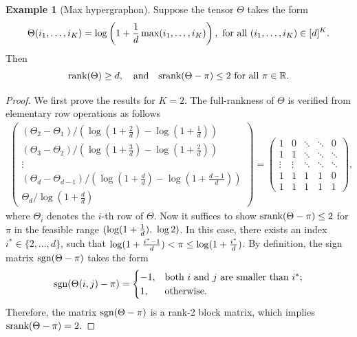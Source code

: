 \documentclass[11pt]{article}
\theoremstyle{plain}
\theoremstyle{definition}
\newtheorem{example}{Example}
\def\sign{\textup{sgn}}
\def\srank{\textup{srank}}
\def\rank{\textup{rank}}
\begin{document}
\begin{example}[Max hypergraphon]\label{example:max} Suppose the tensor $\Theta$ takes the form 
\[
\Theta(i_1,\ldots,i_K)=\log\left(1+{1\over d}\max(i_1,\ldots,i_K)\right), \ \text{for all }(i_1,\ldots,i_K)\in[d]^K.
\]
 Then 
 \[
 \rank(\Theta)\geq d, \quad \text{and}\quad \srank(\Theta-\pi)\leq 2\ \text{for all }\pi\in\mathbb{R}. 
 \]
\end{example}
\begin{proof}
We first prove the results for $K=2$. The full-rankness of $\Theta$ is verified from elementary row operations as follows
\begin{align}
\begin{pmatrix}
(\Theta_2-\Theta_1)/(\log(1+\frac{2}{d})-\log(1+\frac{1}{d}))\\(\Theta_3-\Theta_2)/(\log(1+\frac{3}{d})-\log(1+\frac{2}{d}))\\\vdots\\ (\Theta_d-\Theta_{d-1})/(\log(1+\frac{d}{d})-\log(1+\frac{d-1}{d}))\\\Theta_d/\log(1+\frac{d}{d})
\end{pmatrix} = \begin{pmatrix}
 1&          0  &      \ddots  &          \ddots  &          0 \\
1& 1 & \ddots &          \ddots    &         \ddots    \\
      \vdots &     \vdots & \ddots &       \ddots &     \ddots   \\
 1 & 1 &1 & 1 &0\\
 1 & 1 &1 & 1 &1
\end{pmatrix},
\end{align}
where $\Theta_i$ denotes the $i$-th row of $\Theta$. 
Now it suffices to show $\srank(\Theta-\pi)\leq 2$ for $\pi$ in the feasible range $(\log(1+{1\over d}),\ \log 2)$. In this case, there exists an index $i^*\in\{2,\ldots,d\}$, such that $\log(1+{i^*-1\over d})< \pi\leq \log(1+{i^*\over d})$. By definition, the sign matrix $\sign (\Theta-\pi)$ takes the form
\begin{equation}\label{eq:matrix}
\sign (\Theta(i,j)-\pi)=
\begin{cases}
-1, & \text{both $i$ and $j$ are smaller than $i^*$};\\
1, & \text{otherwise}.
\end{cases}
\end{equation}
Therefore, the matrix $\sign (\Theta-\pi)$ is a rank-2 block matrix, which implies $\srank(\Theta-\pi)=2$. 


\end{proof}
\end{document}
